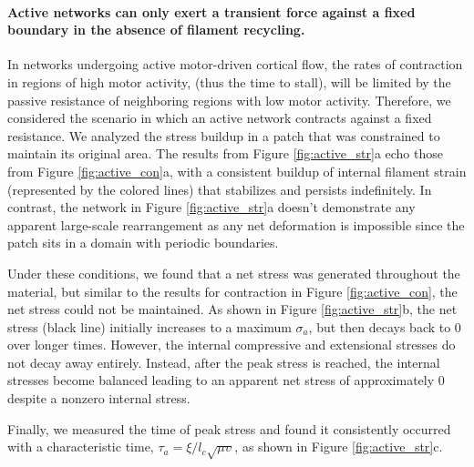 \documentclass[10pt,letterpaper]{article}
\begin{document}
\paragraph{Active networks can only exert a transient force against a fixed boundary in the absence of filament recycling.}

In networks undergoing active motor-driven cortical flow, the rates of contraction in regions of high motor activity, (thus the time to stall), will be limited by the passive resistance of neighboring regions with low motor activity. Therefore, we considered the scenario in which an active network contracts against a fixed resistance.  We analyzed the stress buildup in a patch that was constrained to maintain its original area.  The results from Figure \ref{fig:active_str}a echo those from Figure \ref{fig:active_con}a, with a consistent buildup of internal filament strain (represented by the colored lines) that stabilizes and persists indefinitely.  In contrast, the network in Figure \ref{fig:active_str}a doesn't demonstrate any apparent large-scale rearrangement as any net deformation is impossible since the patch sits in a domain with periodic boundaries.

Under these conditions, we found that a net stress was generated throughout the material, but similar to the results for contraction in Figure \ref{fig:active_con}, the net stress could not be maintained.  As shown in Figure \ref{fig:active_str}b, the net stress (black line) initially increases to a maximum $\sigma_a$, but then decays back to 0 over longer times. However, the internal compressive and extensional stresses do not decay away entirely.  Instead, after the peak stress is reached, the internal stresses become balanced leading to an apparent net stress of approximately 0 despite a nonzero internal stress.  

Finally, we measured the time of peak stress and found it consistently occurred with a characteristic time, $\tau_a=\xi/l_c\sqrt{\mu\upsilon}$, as shown in Figure \ref{fig:active_str}c. 
\end{document}
